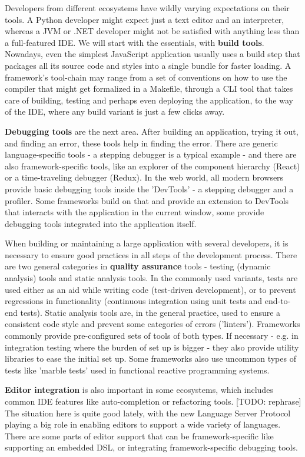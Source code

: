 \documentclass[english,odsaz]{fitthesis}
\begin{document}
Developers from different ecosystems have wildly varying expectations on their
tools. A Python developer might expect just a text editor and an interpreter,
whereas a JVM or .NET developer might not be satisfied with anything less than a
full-featured IDE. We will start with the essentials, with \textbf{build
tools}. Nowadays, even the simplest JavaScript application usually uses a build
step that packages all its source code and styles into a single bundle for
faster loading. A framework's tool-chain may range from a set of conventions on
how to use the compiler that might get formalized in a Makefile, through a CLI
tool that takes care of building, testing and perhaps even deploying the
application, to the way of the IDE, where any build variant is just a few clicks
away.

\textbf{Debugging tools} are the next area. After building an application, trying it out,
and finding an error, these tools help in finding the error. There are generic
language-specific tools - a stepping debugger is a typical example - and there
are also framework-specific tools, like an explorer of the component hierarchy
(React) or a time-traveling debugger (Redux). In the web world, all modern
browsers provide basic debugging tools inside the 'DevTools' - a stepping
debugger and a profiler. Some frameworks build on that and provide an extension
to DevTools that interacts with the application in the current window, some
provide debugging tools integrated into the application itself.

When building or maintaining a large application with several developers, it is
necessary to ensure good practices in all steps of the development
process. There are two general categories in \textbf{quality assurance} tools - testing
(dynamic analysis) tools and static analysis tools. In the commonly used
variants, tests are used either as an aid while writing code (test-driven
development), or to prevent regressions in functionality (continuous integration
using unit tests and end-to-end tests). Static analysis tools are, in the
general practice, used to ensure a consistent code style and prevent some
categories of errors ('linters'). Frameworks commonly provide pre-configured
sets of tools of both types. If necessary - e.g. in integration testing where
the burden of set up is bigger - they also provide utility libraries to ease the
initial set up. Some frameworks also use uncommon types of tests like 'marble
tests' used in functional reactive programming systems.

\textbf{Editor integration} is also important in some ecosystems, which includes common
IDE features like auto-completion or refactoring tools. [TODO: rephrase] The situation here is
quite good lately, with the new Language Server Protocol \cite{lsp} playing a big
role in enabling editors to support a wide variety of languages. There are some
parts of editor support that can be framework-specific like supporting an embedded
DSL, or integrating framework-specific debugging tools.
\end{document}
